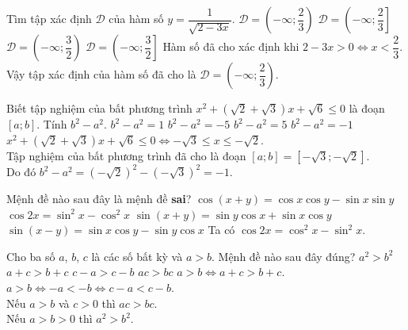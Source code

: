 \begin{ex}%
 Tìm tập xác định $\mathscr{D}$ của hàm số $y = \dfrac{1}{\sqrt{2-3x}}$.
 \choice
  {\True $\mathscr{D} = \left(-\infty; \dfrac{2}{3}\right)$}
  {$\mathscr{D} = \left(-\infty; \dfrac{2}{3}\right]$}
  {$\mathscr{D} = \left(-\infty; \dfrac{3}{2}\right)$}
  {$\mathscr{D} = \left(-\infty; \dfrac{3}{2}\right]$}
 \loigiai
 {
 Hàm số đã cho xác định khi $2 - 3x > 0 \Leftrightarrow x < \dfrac{2}{3}$.\\
 Vậy tập xác định của hàm số đã cho là $\mathscr{D} = \left(-\infty; \dfrac{2}{3}\right)$.
 }
\end{ex}


\begin{ex}%
 Biết tập nghiệm của bất phương trình $x^2 + \left( \sqrt{2} + \sqrt{3} \right)x + \sqrt{6} \leq 0$ là đoạn $[a;b]$. Tính $b^2 - a^2$.
 \choice
  {$b^2 - a^2 = 1$}
  {$b^2 - a^2 = -5$}
  {$b^2 - a^2 = 5$}
  {\True $b^2 - a^2 = -1$}
 \loigiai
 {
 $x^2 + \left( \sqrt{2} + \sqrt{3} \right)x + \sqrt{6} \leq 0 \Leftrightarrow -\sqrt{3} \leq x \leq -\sqrt{2}$.\\
 Tập nghiệm của bất phương trình đã cho là đoạn $[a; b] = \left[ -\sqrt{3}; - \sqrt{2}\right]$.\\
 Do đó $b^2 - a^2 = \left( -\sqrt{2} \right)^2 - \left( -\sqrt{3} \right)^2 = -1$.
 }
\end{ex}


\begin{ex}%
 Mệnh đề nào sau đây là mệnh đề \textbf{sai}?
 \choice
  {$\cos(x+y) = \cos x \cos y - \sin x \sin y$}
  {\True $\cos 2x = \sin^2 x - \cos^2 x$}
  {$\sin(x+y) = \sin y \cos x + \sin x \cos y$}
  {$\sin(x-y) = \sin x \cos y - \sin y \cos x$}
 \loigiai
 {
 Ta có $\cos 2x = \cos^2 x - \sin^2 x$.
 }
\end{ex}


\begin{ex}%
 Cho ba số $a$, $b$, $c$ là các số bất kỳ và $a>b$. Mệnh đề nào sau đây đúng?
 \choice
  {$a^2 > b^2$}
  {\True $a+c > b+c$}
  {$c-a > c-b$}
  {$ac > bc$}
 \loigiai
 {
 $a > b \Leftrightarrow a + c > b + c$.\\
 $a > b \Leftrightarrow -a < -b \Leftrightarrow c - a < c - b$.\\
 Nếu $a > b$ và $c > 0$ thì $ac > bc$.\\
 Nếu $a > b > 0$ thì $a^2 > b^2$.
 }
\end{ex}


